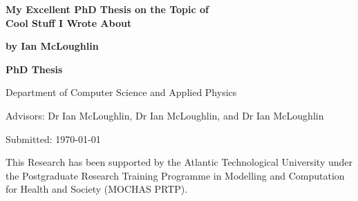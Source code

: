 
\newcommand{\thesistitle}{My Excellent PhD Thesis on the Topic of\\Cool Stuff I Wrote About}
\newcommand{\thesisauthor}{by Ian McLoughlin}
\newcommand{\thesisadvisor}{Advisors: Dr Ian McLoughlin, Dr Ian McLoughlin, and Dr Ian McLoughlin}
\newcommand{\thesistype}{PhD Thesis}
\newcommand{\thesisdate}{Submitted: \today}
\newcommand{\thesisdepartment}{Department of Computer Science and Applied Physics}
\newcommand{\thesisfunding}{This Research has been supported by the Atlantic Technological University under the Postgraduate Research Training Programme in Modelling and Computation for Health and Society (MOCHAS PRTP).}

\begin{titlingpage}
  
  {\noindent\Huge\textbf{\thesistitle}\par}
  \vspace{12mm}
  {\noindent\LARGE\textbf{\thesisauthor}\par}
  \vspace{32mm}
  {\noindent\Large\textbf{\thesistype}\par}
  \vspace{4mm}
  {\noindent\Large\thesisdepartment\par}
  \vspace{4mm}
  {\noindent\Large\thesisadvisor\par}
  \vspace{4mm}
  {\noindent\Large\thesisdate\par}
  \vspace{32mm}
  {\noindent\thesisfunding\par}


  
\end{titlingpage}